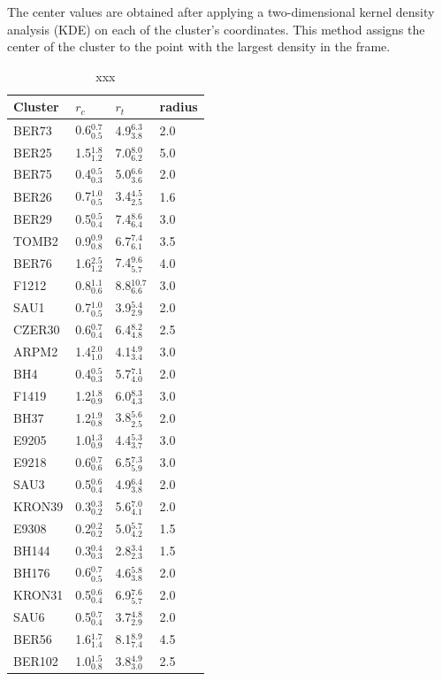 \documentclass{aa}
\begin{document}
 The center values are obtained after applying a two-dimensional kernel density
 analysis (KDE) on each of the cluster's coordinates. This method assigns the
 center of the cluster to the point with the largest density in the frame. 

  \begin{table}
  \caption{xxx}
  \label{tab:radii}
  \centering
  \begin{tabular}{llll}
  \hline\hline
  Cluster & $r_{c}$  &  $r_{t}$ & radius\\
  \hline
   BER73         & 0.6$_{0.5}^{0.7}$ &  4.9$_{3.8}^{6.3}$ &  2.0\\
   BER25         & 1.5$_{1.2}^{1.8}$ &  7.0$_{6.2}^{8.0}$ &  5.0\\
   BER75         & 0.4$_{0.3}^{0.5}$ &  5.0$_{3.6}^{6.6}$ &  2.0\\
   BER26         & 0.7$_{0.5}^{1.0}$ &  3.4$_{2.5}^{4.5}$ &  1.6\\
   BER29         & 0.5$_{0.4}^{0.5}$ &  7.4$_{6.4}^{8.6}$ &  3.0\\
   TOMB2         & 0.9$_{0.8}^{0.9}$ &  6.7$_{6.1}^{7.4}$ &  3.5\\
   BER76         & 1.6$_{1.2}^{2.5}$ &  7.4$_{5.7}^{9.6}$ &  4.0\\
   F1212         & 0.8$_{0.6}^{1.1}$ &  8.8$_{6.6}^{10.7}$ & 3.0\\
   SAU1          & 0.7$_{0.5}^{1.0}$ &  3.9$_{2.9}^{5.4}$ &  2.0\\
   CZER30        & 0.6$_{0.4}^{0.7}$ &  6.4$_{4.8}^{8.2}$ &  2.5\\
   ARPM2         & 1.4$_{1.0}^{2.0}$ &  4.1$_{3.4}^{4.9}$ &  3.0\\
   BH4           & 0.4$_{0.3}^{0.5}$ &  5.7$_{4.0}^{7.1}$ &  2.0\\
   F1419         & 1.2$_{0.9}^{1.8}$ &  6.0$_{4.3}^{8.3}$ &  3.0\\
   BH37          & 1.2$_{0.8}^{1.9}$ &  3.8$_{2.5}^{5.6}$ &  2.0\\
   E9205         & 1.0$_{0.9}^{1.3}$ &  4.4$_{3.7}^{5.3}$ &  3.0\\
   E9218         & 0.6$_{0.6}^{0.7}$ &  6.5$_{5.9}^{7.3}$ &  3.0\\
   SAU3          & 0.5$_{0.4}^{0.6}$ &  4.9$_{3.8}^{6.4}$ &  2.0\\
   KRON39        & 0.3$_{0.2}^{0.3}$ &  5.6$_{4.1}^{7.0}$ &  2.0\\
   E9308         & 0.2$_{0.2}^{0.2}$ &  5.0$_{4.2}^{5.7}$ &  1.5\\
   BH144         & 0.3$_{0.3}^{0.4}$ &  2.8$_{2.3}^{3.4}$ &  1.5\\
   BH176         & 0.6$_{0.5}^{0.7}$ &  4.6$_{3.8}^{5.8}$ &  2.0\\
   KRON31        & 0.5$_{0.4}^{0.6}$ &  6.9$_{5.7}^{7.6}$ &  2.0\\
   SAU6          & 0.5$_{0.4}^{0.7}$ &  3.7$_{2.9}^{4.8}$ &  2.0\\
   BER56         & 1.6$_{1.4}^{1.7}$ &  8.1$_{7.4}^{8.9}$ &  4.5\\
   BER102        & 1.0$_{0.8}^{1.5}$ &  3.8$_{3.0}^{4.9}$ &  2.5\\
  \hline
  \end{tabular}
  \end{table}
\end{document}
